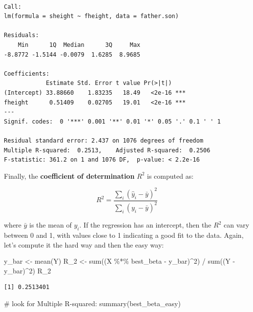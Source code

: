 \documentclass[
  letterpaper,
  DIV=11,
  numbers=noendperiod]{scrreprt}
\newenvironment{Shaded}{\begin{snugshade}}{\end{snugshade}}
\newcommand{\CommentTok}[1]{\textcolor[rgb]{0.37,0.37,0.37}{#1}}
\newcommand{\DecValTok}[1]{\textcolor[rgb]{0.68,0.00,0.00}{#1}}
\newcommand{\FunctionTok}[1]{\textcolor[rgb]{0.28,0.35,0.67}{#1}}
\newcommand{\NormalTok}[1]{\textcolor[rgb]{0.00,0.23,0.31}{#1}}
\newcommand{\OtherTok}[1]{\textcolor[rgb]{0.00,0.23,0.31}{#1}}
\newcommand{\SpecialCharTok}[1]{\textcolor[rgb]{0.37,0.37,0.37}{#1}}
\begin{document}
\begin{verbatim}

Call:
lm(formula = sheight ~ fheight, data = father.son)

Residuals:
    Min      1Q  Median      3Q     Max 
-8.8772 -1.5144 -0.0079  1.6285  8.9685 

Coefficients:
            Estimate Std. Error t value Pr(>|t|)    
(Intercept) 33.88660    1.83235   18.49   <2e-16 ***
fheight      0.51409    0.02705   19.01   <2e-16 ***
---
Signif. codes:  0 '***' 0.001 '**' 0.01 '*' 0.05 '.' 0.1 ' ' 1

Residual standard error: 2.437 on 1076 degrees of freedom
Multiple R-squared:  0.2513,    Adjusted R-squared:  0.2506 
F-statistic: 361.2 on 1 and 1076 DF,  p-value: < 2.2e-16
\end{verbatim}

Finally, the \textbf{coefficient of determination} \(R^2\) is computed
as:

\[
R^2 = \frac{\sum_i (\hat{y}_i - \bar{y})^2}{\sum_i ({y}_i - \bar{y})^2}
\]

where \(\bar{y}\) is the mean of \(y_i\). If the regression has an
intercept, then the \(R^2\) can vary between 0 and 1, with values close
to 1 indicating a good fit to the data. Again, let's compute it the hard
way and then the easy way:

\begin{Shaded}
\begin{Highlighting}[]
\NormalTok{y\_bar }\OtherTok{\textless{}{-}} \FunctionTok{mean}\NormalTok{(Y)}
\NormalTok{R\_2 }\OtherTok{\textless{}{-}} \FunctionTok{sum}\NormalTok{((X }\SpecialCharTok{\%*\%}\NormalTok{ best\_beta }\SpecialCharTok{{-}}\NormalTok{ y\_bar)}\SpecialCharTok{\^{}}\DecValTok{2}\NormalTok{) }\SpecialCharTok{/} \FunctionTok{sum}\NormalTok{((Y }\SpecialCharTok{{-}}\NormalTok{ y\_bar)}\SpecialCharTok{\^{}}\DecValTok{2}\NormalTok{)}
\NormalTok{R\_2}
\end{Highlighting}
\end{Shaded}

\begin{verbatim}
[1] 0.2513401
\end{verbatim}

\begin{Shaded}
\begin{Highlighting}[]
\CommentTok{\# look for Multiple R{-}squared:}
\FunctionTok{summary}\NormalTok{(best\_beta\_easy)}
\end{Highlighting}
\end{Shaded}
\end{document}

